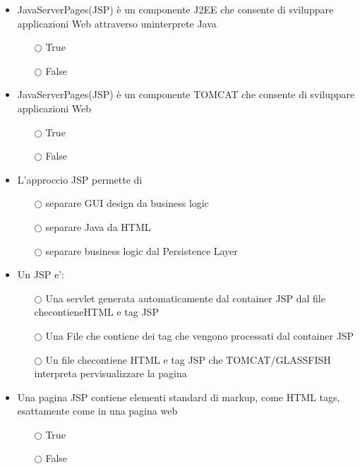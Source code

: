 \documentclass[10pt,twocolumn]{article}
\begin{document}
\begin{itemize}
    \item JavaServerPages(JSP) è un componente J2EE che consente di sviluppare applicazioni Web attraverso uninterprete Java
          \begin{itemize}
              \item[$\bigcirc$] True
              \item[$\bigcirc$] False
          \end{itemize}
\end{itemize}
\begin{itemize}
    \item JavaServerPages(JSP) è un componente TOMCAT che consente di sviluppare applicazioni Web
          \begin{itemize}
              \item[$\bigcirc$] True
              \item[$\bigcirc$] False
          \end{itemize}
\end{itemize}
\begin{itemize}
    \item L’approccio JSP permette di
          \begin{itemize}
              \item[$\bigcirc$] separare GUI design da business logic
              \item[$\bigcirc$] separare Java da HTML
              \item[$\bigcirc$] separare business logic dal Persistence Layer
          \end{itemize}
\end{itemize}
\begin{itemize}
    \item Un JSP e':
          \begin{itemize}
              \item[$\bigcirc$] Una servlet generata automaticamente dal container JSP dal file checontieneHTML e tag JSP
              \item[$\bigcirc$] Una File che contiene dei tag che vengono processati dal container JSP
              \item[$\bigcirc$] Un file checontiene HTML e tag JSP che TOMCAT/GLASSFISH interpreta pervisualizzare la pagina
          \end{itemize}
\end{itemize}
\begin{itemize}
    \item Una pagina JSP contiene elementi standard di markup, come HTML tags, esattamente come in una pagina web
          \begin{itemize}
              \item[$\bigcirc$] True
              \item[$\bigcirc$] False
          \end{itemize}
\end{itemize}
\end{document}

